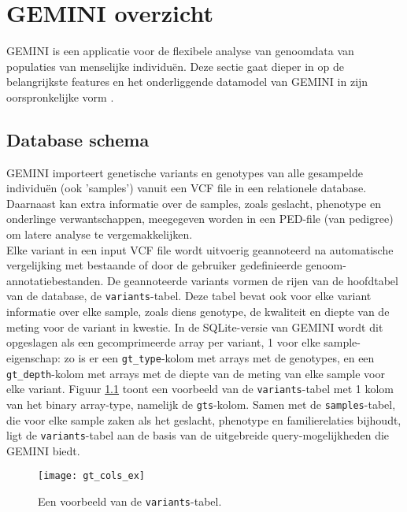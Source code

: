 \chapter{GEMINI overzicht}
\label{gemini_beschrijving}

GEMINI is een applicatie voor de flexibele analyse van genoomdata van populaties van menselijke individu\"en. Deze sectie gaat dieper in op de belangrijkste features en het onderliggende datamodel van GEMINI in zijn oorspronkelijke vorm \cite{10.1371/journal.pcbi.1003153}\cite{gemini_docs}.

\section{Database schema}

GEMINI importeert genetische variants en genotypes van alle gesampelde individu\"en (ook 'samples') vanuit een VCF file in een relationele database.
Daarnaast kan extra informatie over de samples, zoals geslacht, phenotype en onderlinge verwantschappen, meegegeven worden in een PED-file (van pedigree) om latere analyse te vergemakkelijken.\\

Elke variant in een input VCF file wordt uitvoerig geannoteerd na automatische vergelijking met bestaande of door de gebruiker gedefinieerde genoom-annotatiebestanden. De geannoteerde variants vormen de rijen van de hoofdtabel van de database, de \texttt{variants}-tabel. Deze tabel bevat ook voor elke variant informatie over elke sample, zoals diens genotype, de kwaliteit en diepte van de meting voor de variant in kwestie. In de SQLite-versie van GEMINI wordt dit opgeslagen als een gecomprimeerde array per variant, 1 voor elke sample-eigenschap: zo is er een \texttt{gt\_type}-kolom met arrays met de genotypes, en een \texttt{gt\_depth}-kolom met arrays met de diepte van de meting van elke sample voor elke variant. Figuur \ref{gt_cols_ex} toont een voorbeeld van de \texttt{variants}-tabel met 1 kolom van het binary array-type, namelijk de \texttt{gts}-kolom. Samen met de \texttt{samples}-tabel, die voor elke sample zaken als het geslacht, phenotype en familierelaties bijhoudt, ligt de \texttt{variants}-tabel aan de basis van de uitgebreide query-mogelijkheden die GEMINI biedt.\\

\begin{figure}[!h]
\texttt{[image: gt\_cols\_ex]}
\caption{Een voorbeeld van de \texttt{variants}-tabel.}
\label{gt_cols_ex}
\end{figure}

